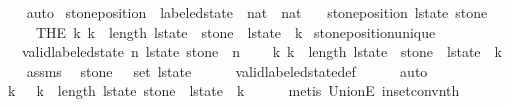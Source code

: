 \begin{isabellebody}
\ \ \isamarkupfalse%
\ auto%
\endisatagproof
{\isafoldproof}%
%
\isadelimproof
\isanewline
%
\endisadelimproof
\isanewline
{}\isamarkupfalse%
\ stone{\isacharunderscore}position\ {\isacharcolon}{\isacharcolon}\ {\isachardoublequoteopen}labeled{\isacharunderscore}state\ {\isasymRightarrow}\ nat\ {\isasymRightarrow}\ nat{\isachardoublequoteclose}\ \isanewline
\ \ {\isachardoublequoteopen}stone{\isacharunderscore}position\ l{\isacharunderscore}state\ stone\ {\isacharequal}\ \isanewline
\ \ \ \ \ {\isacharparenleft}THE\ k{\isachardot}\ k\ {\isacharless}\ length\ l{\isacharunderscore}state\ {\isasymand}\ stone\ {\isasymin}\ l{\isacharunderscore}state\ {\isacharbang}\ k{\isacharparenright}{\isachardoublequoteclose}\isanewline
\isanewline
{}\isamarkupfalse%
\ stone{\isacharunderscore}position{\isacharunderscore}unique{\isacharcolon}\isanewline
\ \ \ {\isachardoublequoteopen}valid{\isacharunderscore}labeled{\isacharunderscore}state\ n\ l{\isacharunderscore}state{\isachardoublequoteclose}\ {\isachardoublequoteopen}stone\ {\isacharless}\ n{\isachardoublequoteclose}\isanewline
\ \ \ {\isachardoublequoteopen}{\isasymexists}{\isacharbang}\ k{\isachardot}\ k\ {\isacharless}\ length\ l{\isacharunderscore}state\ {\isasymand}\ stone\ {\isasymin}\ l{\isacharunderscore}state\ {\isacharbang}\ k{\isachardoublequoteclose}\isanewline
%
\isadelimproof
%
\endisadelimproof
%
\isatagproof
{}\isamarkupfalse%
{\isacharminus}\isanewline
\ \ \isamarkupfalse%
\ assms\ \isamarkupfalse%
\ {\isachardoublequoteopen}stone\ {\isasymin}\ {\isasymUnion}\ {\isacharparenleft}set\ l{\isacharunderscore}state{\isacharparenright}{\isachardoublequoteclose}\isanewline
\ \ \ \ \isamarkupfalse%
\ valid{\isacharunderscore}labeled{\isacharunderscore}state{\isacharunderscore}def\isanewline
\ \ \ \ \isamarkupfalse%
\ auto\ \isanewline
\ \ \isamarkupfalse%
\ \isamarkupfalse%
\ k\ \ {\isacharasterisk}{\isacharcolon}\ {\isachardoublequoteopen}k\ {\isacharless}\ length\ l{\isacharunderscore}state{\isachardoublequoteclose}\ {\isachardoublequoteopen}stone\ {\isasymin}\ l{\isacharunderscore}state\ {\isacharbang}\ k{\isachardoublequoteclose}\isanewline
\ \ \ \ \isamarkupfalse%
\ {\isacharparenleft}metis\ UnionE\ in{\isacharunderscore}set{\isacharunderscore}conv{\isacharunderscore}nth{\isacharparenright}\isanewline
\ \ \isamarkupfalse%
\ \isamarkupfalse%

\end{isabellebody}
